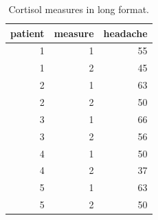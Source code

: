 \documentclass[]{report}\usepackage[]{graphicx}\usepackage[]{color}
\begin{document}
\begin{table}[ht]
\centering
\caption{Cortisol measures in long format.} 
\label{tab:analysisprepost1}
\begin{tabular}{rrr}
  \hline
patient & measure & headache \\ 
  \hline
1 & 1 & 55 \\ 
  1 & 2 & 45 \\ 
  2 & 1 & 63 \\ 
  2 & 2 & 50 \\ 
  3 & 1 & 66 \\ 
  3 & 2 & 56 \\ 
  4 & 1 & 50 \\ 
  4 & 2 & 37 \\ 
  5 & 1 & 63 \\ 
  5 & 2 & 50 \\ 
   \hline
\end{tabular}
\end{table}
\end{document}
